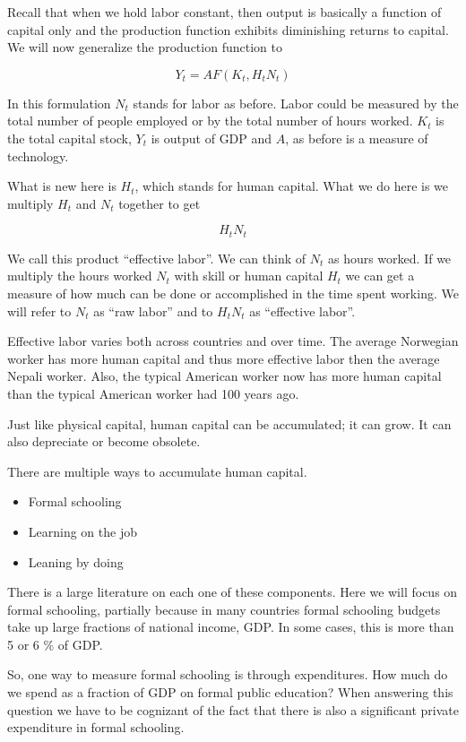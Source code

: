 \documentclass[
]{book}
\providecommand{\tightlist}{%
  \setlength{\itemsep}{0pt}\setlength{\parskip}{0pt}}
\begin{document}
Recall that when we hold labor constant, then output is basically a function of capital only and the production function exhibits diminishing returns to capital.
We will now generalize the production function to

\[Y_t = A F (K_t, H_tN_t)\]

In this formulation \(N_t\) stands for labor as before. Labor could be measured by the total number of people employed or by the total number of hours worked. \(K_t\) is the total capital stock, \(Y_t\) is output of GDP and \(A\), as before is a measure of technology.

What is new here is \(H_t\), which stands for human capital. What we do here is we multiply \(H_t\) and \(N_t\) together to get

\[H_tN_t\]

We call this product ``effective labor''. We can think of \(N_t\) as hours worked. If we multiply the hours worked \(N_t\) with skill or human capital \(H_t\) we can get a measure of how much can be done or accomplished in the time spent working. We will refer to \(N_t\) as ``raw labor'' and to \(H_tN_t\) as ``effective labor''.

Effective labor varies both across countries and over time. The average Norwegian worker has more human capital and thus more effective labor then the average Nepali worker. Also, the typical American worker now has more human capital than the typical American worker had 100 years ago.

Just like physical capital, human capital can be accumulated; it can grow. It can also depreciate or become obsolete.

There are multiple ways to accumulate human capital.

\begin{itemize}
\tightlist
\item
  Formal schooling
\item
  Learning on the job
\item
  Leaning by doing
\end{itemize}

There is a large literature on each one of these components. Here we will focus on formal schooling, partially because in many countries formal schooling budgets take up large fractions of national income, GDP. In some cases, this is more than 5 or 6 \% of GDP.

So, one way to measure formal schooling is through expenditures. How much do we spend as a fraction of GDP on formal public education? When answering this question we have to be cognizant of the fact that there is also a significant private expenditure in formal schooling.
\end{document}
